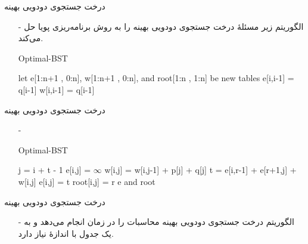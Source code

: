 \begin{frame}{‌درخت جستجوی دودویی بهینه}
\begin{itemize}\itemr
\item[-]
الگوریتم زیر مسئلهٔ درخت جستجوی دودویی بهینه را به روش برنامه‌ریزی پویا حل می‌کند.
\begin{algorithm}[H]\alglr
  \caption{Optimal-BST} 
  \begin{algorithmic}[1]
    \State let e[1:n+1 , 0:n], w[1:n+1 , 0:n], and root[1:n , 1:n] be new tables
      
      \State e[i,i-1] = q[i-1]
      \State w[i,i-1] = q[i-1]
    \EndFor                        
  \end{algorithmic}
  \label{alg:merge}
\end{algorithm}
\end{itemize}
\end{frame}


\begin{frame}{‌درخت جستجوی دودویی بهینه}
\begin{itemize}\itemr
\item[-]
\begin{algorithm}[H]\alglr
  \caption{Optimal-BST} 
  \begin{algorithmic}[1]
  \setcounter{ALG@line}{4}
    		\State j = i + t - 1
    		\State e[i,j] = $\infty$
    		\State w[i,j] = w[i,j-1] + p[j] + q[j]
    		  
    		 		\State t = e[i,r-1] + e[r+1,j] + w[i,j] 
    		 		 
    		 				\State e[i,j] = t
    		 				\State root[i,j] = r
    		 		\EndIf
    		 \EndFor
    	\EndFor
    \EndFor
   \State \Return e and root                         
  \end{algorithmic}
  \label{alg:merge}
\end{algorithm}
\end{itemize}
\end{frame}


\begin{frame}{‌درخت جستجوی دودویی بهینه}
\begin{itemize}\itemr
\item[-]
الگوریتم درخت جستجوی دودویی بهینه محاسبات را در زمان
انجام می‌دهد و به یک جدول با اندازهٔ
نیاز دارد.
\end{itemize}
\end{frame}


